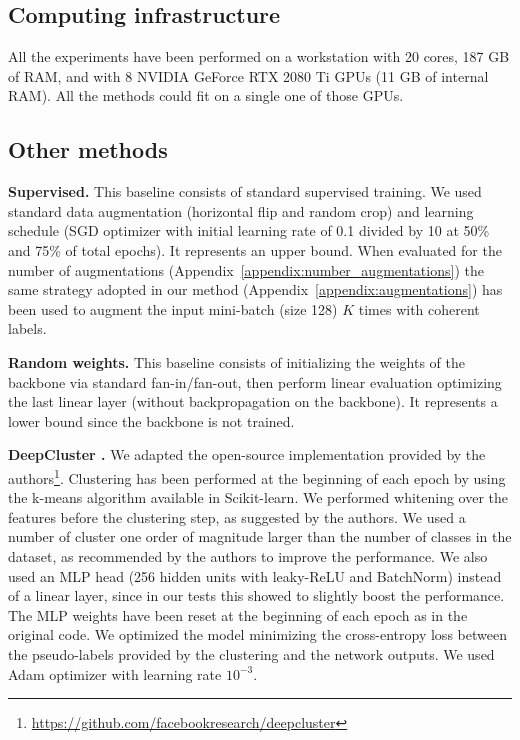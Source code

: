 \documentclass{article}
\begin{document}
\subsection{Computing infrastructure} \label{appendix:computing_infrastracture}

All the experiments have been performed on a workstation with 20 cores, 187 GB of RAM, and with 8 NVIDIA GeForce RTX 2080 Ti GPUs (11 GB of internal RAM). All the methods could fit on a single one of those GPUs.

\subsection{Other methods}

\textbf{Supervised.} This baseline consists of standard supervised training. We used standard data augmentation (horizontal flip and random crop) and learning schedule (SGD optimizer with initial learning rate of 0.1 divided by 10 at 50\% and 75\% of total epochs). It represents an upper bound. When evaluated for the number of augmentations (Appendix~\ref{appendix:number_augmentations}) the same strategy adopted in our method (Appendix~\ref{appendix:augmentations}) has been used to augment the input mini-batch (size 128) $K$ times with coherent labels.

\textbf{Random weights.} This baseline consists of initializing the weights of the backbone via standard fan-in/fan-out, then perform linear evaluation optimizing the last linear layer (without backpropagation on the backbone). It represents a lower bound since the backbone is not trained.

\textbf{DeepCluster \citep{caron2018deep}.}  We adapted the open-source implementation provided by the authors\footnote{\url{https://github.com/facebookresearch/deepcluster}}. Clustering has been performed at the beginning of each epoch by using the k-means algorithm available in Scikit-learn. We performed whitening over the features before the clustering step, as suggested by the authors. We used a number of cluster one order of magnitude larger than the number of classes in the dataset, as recommended by the authors to improve the performance. We also used an MLP head (256 hidden units with leaky-ReLU and BatchNorm) instead of a linear layer, since in our tests this showed to slightly boost the performance. The MLP weights have been reset at the beginning of each epoch as in the original code. We optimized the model minimizing the cross-entropy loss between the pseudo-labels provided by the clustering and the network outputs. We used Adam optimizer with learning rate $10^{-3}$.
\end{document}
